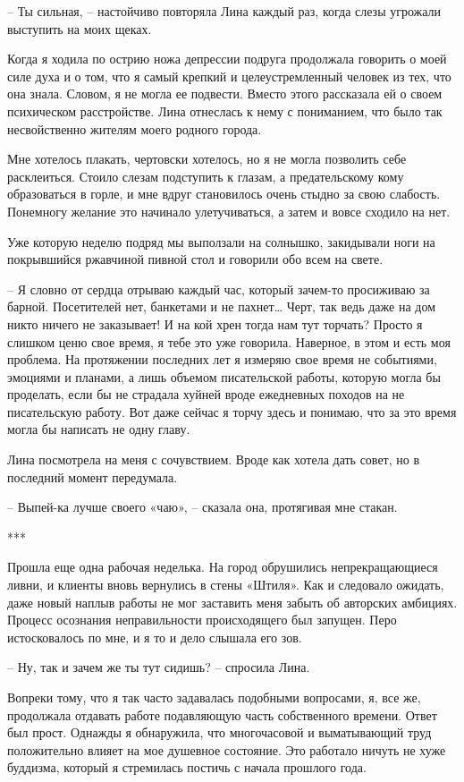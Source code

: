 \documentclass[
]{book}
\begin{document}
-- Ты сильная, -- настойчиво повторяла Лина каждый раз, когда слезы угрожали выступить на моих щеках.

Когда я ходила по острию ножа депрессии подруга продолжала говорить о моей силе духа и о том, что я самый крепкий и целеустремленный человек из тех, что она знала. Словом, я не могла ее подвести. Вместо этого рассказала ей о своем психическом расстройстве. Лина отнеслась к нему с пониманием, что было так несвойственно жителям моего родного города.

Мне хотелось плакать, чертовски хотелось, но я не могла позволить себе расклеиться. Стоило слезам подступить к глазам, а предательскому кому образоваться в горле, и мне вдруг становилось очень стыдно за свою слабость. Понемногу желание это начинало улетучиваться, а затем и вовсе сходило на нет.

Уже которую неделю подряд мы выползали на солнышко, закидывали ноги на покрывшийся ржавчиной пивной стол и говорили обо всем на свете.

-- Я словно от сердца отрываю каждый час, который зачем-то просиживаю за барной. Посетителей нет, банкетами и не пахнет\ldots{} Черт, так ведь даже на дом никто ничего не заказывает! И на кой хрен тогда нам тут торчать? Просто я слишком ценю свое время, я тебе это уже говорила. Наверное, в этом и есть моя проблема. На протяжении последних лет я измеряю свое время не событиями, эмоциями и планами, а лишь объемом писательской работы, которую могла бы проделать, если бы не страдала хуйней вроде ежедневных походов на не писательскую работу. Вот даже сейчас я торчу здесь и понимаю, что за это время могла бы написать не одну главу.

Лина посмотрела на меня с сочувствием. Вроде как хотела дать совет, но в последний момент передумала.

-- Выпей-ка лучше своего «чаю», -- сказала она, протягивая мне стакан.

***

Прошла еще одна рабочая неделька. На город обрушились непрекращающиеся ливни, и клиенты вновь вернулись в стены «Штиля». Как и следовало ожидать, даже новый наплыв работы не мог заставить меня забыть об авторских амбициях. Процесс осознания неправильности происходящего был запущен. Перо истосковалось по мне, и я то и дело слышала его зов.

-- Ну, так и зачем же ты тут сидишь? -- спросила Лина.

Вопреки тому, что я так часто задавалась подобными вопросами, я, все же, продолжала отдавать работе подавляющую часть собственного времени. Ответ был прост. Однажды я обнаружила, что многочасовой и выматывающий труд положительно влияет на мое душевное состояние. Это работало ничуть не хуже буддизма, который я стремилась постичь с начала прошлого года.
\end{document}
